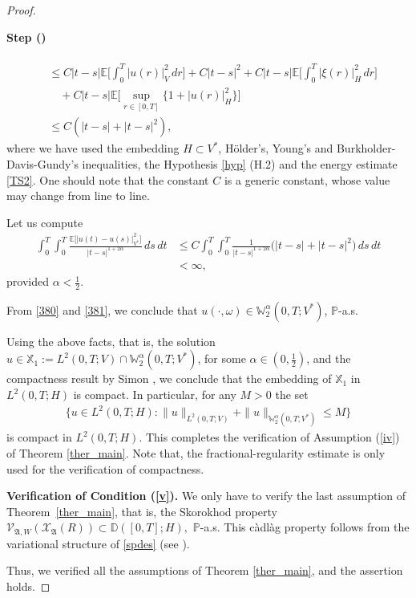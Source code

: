 \documentclass[english,a4paper,11pt]{amsart}
\theoremstyle{plain}
\theoremstyle{definition}
\theoremstyle{remark}
\numberwithin{equation}{section}
\newcounter{lil1}
\newenvironment{step}
{\begin{list} { \bf Step (\Roman{lil1})}
		{ \usecounter{lil1}
			\setlength{\leftmargin}{0.0cm}
			\setlength{\topsep}{0.2cm}
			\setlength{\itemsep}{0.0cm}
			\setlength{\parsep}{0.1cm}
			\setlength{\itemindent}{0.8cm}
			\setlength{\parskip}{0.0cm}}}
	{\end{list}}
\newcounter{lil33}
\newcounter{lil1q}
\newcommand{\PP}{{\mathbb{P}}}
\newcommand{\EE}{ \mathbb{E} }
\newcommand{\Vcal} {{\mathcal V}}
\newcommand{\Xcal} {{\mathcal X}}
\newcommand{\Afrak} {{\mathfrak A}}
\renewcommand{\P}{\mathbb{P}}
\newcommand{\X}{\mathbb{X}}
\newcommand{\D}{\mathbb{D}}
\begin{document}
\begin{proof}
\begin{step}
{\begin{align}
	\\&\nonumber
	\leq C |t-s| \EE\bigg[\int_{0}^{T} | u(r)|_{V}^2\, dr\bigg]+C|t-s|^2 +C|t-s| \EE\bigg[\int_{0}^{T} |\xi(r)|_{H}^{2}\, dr \bigg]
	\\&\nonumber
	\quad + C|t-s|\EE\bigg[\sup_{r\in[0,T]}\big\{1+|u(r)|_{H}^2\big\}\bigg] 
	\\& \leq C(|t-s|+|t-s|^2), 
\end{align} where we have used the embedding $H\subset V^\ast$, H\"older's, Young's and Burkholder-Davis-Gundy's inequalities, the Hypothesis \ref{hyp} (H.2) and the energy estimate \eqref{TS2}. One should note that the constant $C$ is a generic constant, whose value may change from line to line.

Let us compute 
\begin{align}\label{381}\nonumber
	\int_0^T\int_0^T \frac{\EE\big[|u(t)-u(s)|_{V^\ast}^2\big]}{|t-s|^{1+2\alpha}}\, ds\, dt &\leq C \int_0^T \int_0^T\frac{1}{|t-s|^{1+2\alpha}}\big(|t-s|+|t-s|^2\big)\, ds\,  dt\\& <\infty, 
\end{align}provided $\alpha <\frac{1}{2}$. 

From \eqref{380} and \eqref{381}, we conclude that $u(\cdot,\omega)\in \mathbb{W}^{\alpha}_2(0,T;V^{\ast})$, $\PP$-a.s.}









 

Using the above facts, that is, the solution $u\in \X_1:= L^2(0,T;V)\cap \mathbb{W}^\alpha_2(0,T;V^\ast)$, for some $\alpha\in(0,\frac{1}{2})$, and the compactness result by Simon \cite{Simon1986}, we conclude that the embedding of $\X_1$ in $L^2(0,T;H)$ is compact. In particular, for any $M>0$ the set 
\begin{align*}
	\Big\{u\in L^2(0,T;H): \|u\|_{L^2(0,T;V)}+\|u\|_{\mathbb{W}^\alpha_2(0,T;V^\ast)}\leq M \Big\}
\end{align*} is compact in $L^2(0,T;H)$. This completes the verification of Assumption (\ref{iv}) of Theorem \ref{ther_main}. Note that, the fractional-regularity estimate is only used for the verification of compactness.  

\item \textbf{Verification of Condition (\ref{v}).} 
{We only have to verify the last assumption of Theorem~\ref{ther_main}, that is, the Skorokhod property  $\Vcal_{\Afrak,W}(\Xcal_{\Afrak}(R))\subset \D([0,T];H),$ $\P$-a.s. This c\`adl\`ag property follows from the variational structure of \eqref{spdes} (see \cite{KrylovRozovskii,weiroeckner}).}
\end{step}Thus, we verified all the assumptions of Theorem \ref{ther_main}, and the assertion holds.
\end{proof} 
\end{document}
